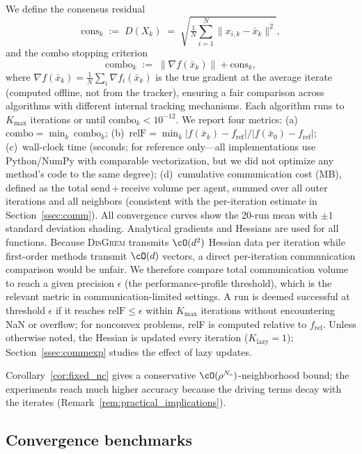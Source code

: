 \documentclass[review,onefignum,onetabnum]{siamart171218}
\begin{document}
	We define the consensus residual
	\[
	  \mathrm{cons}_k
	  \;:=\;
	  D(X_k)
	  \;=\;
	  \sqrt{\tfrac{1}{N}\textstyle\sum_{i=1}^{N}\|x_{i,k}-\bar x_k\|^{2}},
	\]
	and the combo stopping criterion
	\[
	  \mathrm{combo}_k
	  \;:=\;
	  \|\nabla f(\bar x_k)\| + \mathrm{cons}_k,
	\]
	where $\nabla f(\bar x_k)=\frac{1}{N}\sum_{i}\nabla f_i(\bar x_k)$
	is the true gradient at the average iterate (computed offline,
	not from the tracker), ensuring a fair comparison across algorithms
	with different internal tracking mechanisms.
	Each algorithm runs to $K_{\max}$ iterations or until
	$\mathrm{combo}_k < 10^{-12}$.
	We report four metrics:
	(a)~$\mathrm{combo}=\min_k\,\mathrm{combo}_k$;
	(b)~$\mathrm{relF}=\min_k |f(\bar x_k)-f_{\mathrm{ref}}|/|f(\bar x_0)-f_{\mathrm{ref}}|$;
	(c)~wall-clock time (seconds; for reference only---all implementations
	use Python/NumPy with comparable vectorization, but we did not
	optimize any method's code to the same degree);
	(d)~cumulative communication cost (MB), defined as the total
	send\,+\,receive volume per agent, summed over all outer iterations and all
	neighbors (consistent with the per-iteration estimate in Section~\ref{ssec:comm}).
	All convergence curves show the 20-run mean with $\pm1$ standard
	deviation shading.
	Analytical gradients and Hessians are used for all functions.
	Because \textsc{DisGrem} transmits $\cO(d^2)$ Hessian data per
	iteration while first-order methods transmit $\cO(d)$ vectors,
	a direct per-iteration communication comparison would be
	unfair.
	We therefore compare total communication volume to reach
	a given precision $\epsilon$ (the performance-profile threshold),
	which is the relevant metric in communication-limited settings.
	A run is deemed successful at threshold $\epsilon$ if it reaches
	$\mathrm{relF}\le\epsilon$ within $K_{\max}$ iterations without
	encountering NaN or overflow; for nonconvex problems, relF is
	computed relative to $f_{\mathrm{ref}}$.
	Unless otherwise noted, the Hessian is updated every iteration
	($K_{\mathrm{lazy}}{=}1$); Section~\ref{ssec:commexp} studies the
	effect of lazy updates.
	
	Corollary~\ref{cor:fixed_nc} gives a conservative
	$\cO(\rho^{N_c})$-neighborhood bound; the experiments reach
	much higher accuracy because the driving terms decay with the
	iterates (Remark~\ref{rem:practical_implications}).
	
	\FloatBarrier
	\subsection{Convergence benchmarks}\label{ssec:convergence}
	
\end{document}
